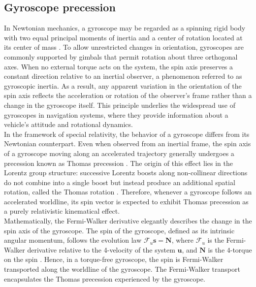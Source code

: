 \documentclass[12pt]{article}
\def\Fermi{\mathscr{F}}
\newcommand{\mbi}[1]{\boldsymbol{#1}}    %
\begin{document}
\subsection{Gyroscope precession}
In Newtonian mechanics, a gyroscope may be regarded as a spinning rigid body with two equal principal moments of inertia and a center of rotation located at its center of mass \cite{goldstein2011classical}. To allow unrestricted changes in orientation, gyroscopes are commonly supported by gimbals that permit rotation about three orthogonal axes. When no external torque acts on the system, the spin axis preserves a constant direction relative to an inertial observer, a phenomenon referred to as gyroscopic inertia. As a result, any apparent variation in the orientation of the spin axis reflects the acceleration or rotation of the observer's frame rather than a change in the gyroscope itself. This principle underlies the widespread use of gyroscopes in navigation systems, where they provide information about a vehicle's attitude and rotational dynamics. \\

In the framework of special relativity, the behavior of a gyroscope differs from its Newtonian counterpart. Even when observed from an inertial frame, the spin axis of a gyroscope moving along an accelerated trajectory generally undergoes a precession known as Thomas precession \cite{jonsson2007gyroscope}. The origin of this effect lies in the Lorentz group structure: successive Lorentz boosts along non-collinear directions do not combine into a single boost but instead produce an additional spatial rotation, called the Thomas rotation \cite{gourgoulhon2013special}. Therefore, whenever a gyroscope follows an accelerated worldline, its spin vector is expected to exhibit Thomas precession as a purely relativistic kinematical effect.\\


Mathematically, the Fermi-Walker derivative elegantly describes the change in the spin axis of the gyroscope. The spin of the gyroscope, defined as its intrinsic angular momentum, follows the evolution law $\Fermi_u \mbi{s}=\mbi{N}$, where $\Fermi_u$ is the Fermi-Walker derivative relative to the 4-velocity of the system $\mbi{u}$, and $\mbi{N}$ is the $4$-torque on the spin \cite{gourgoulhon2013special}. Hence, in a torque-free gyroscope, the spin is Fermi-Walker transported along the worldline of the gyroscope. The Fermi-Walker transport encapsulates the Thomas precession experienced by the gyroscope. \\
\end{document}
